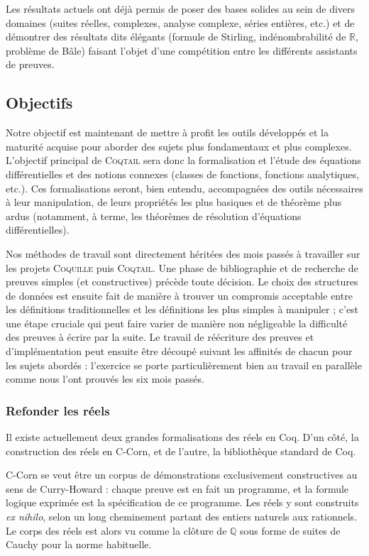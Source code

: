 \documentclass[11pt]{article}
\newcommand{\coqtail}{\textsc{Coqtail}}
\newcommand{\coquille}{\textsc{Coquille}}
\begin{document}
Les résultats actuels ont déjà permis de poser des bases solides au sein de divers domaines (suites réelles, complexes, analyse complexe, séries entières, etc.) et de démontrer des résultats dits élégants (formule de Stirling, indénombrabilité de $\mathbb{R}$, problème de Bâle) faisant l'objet d'une compétition entre les différents assistants de preuves\cite{Freek}.

\subsection{Objectifs}

Notre objectif est maintenant de mettre à profit les outils développés et la maturité acquise pour aborder des sujets plus fondamentaux et plus complexes. L'objectif principal de \coqtail{} sera donc la formalisation et l'étude des équations différentielles et des notions connexes (classes de fonctions, fonctions analytiques, etc.). Ces formalisations seront, bien entendu, accompagnées des outils nécessaires à leur manipulation, de leurs propriétés les plus basiques et de théorème plus ardus (notamment, à terme, les théorèmes de résolution d'équations différentielles).

Nos méthodes de travail sont directement héritées des mois passés à travailler sur les projets \coquille{} puis \coqtail{}. Une phase de bibliographie et de recherche de preuves simples (et constructives) précède toute décision. Le choix des structures de données est ensuite fait de manière à trouver un compromis acceptable entre les définitions traditionnelles et les définitions les plus simples à manipuler ; c'est une étape cruciale qui peut faire varier de manière non négligeable la difficulté des preuves à écrire par la suite. Le travail de réécriture des preuves et d'implémentation peut ensuite être découpé suivant les affinités de chacun pour les sujets abordés : l'exercice se porte particulièrement bien au travail en parallèle comme nous l'ont prouvés les six mois passés.

\subsubsection{Refonder les réels}

Il existe actuellement deux grandes formalisations des réels en Coq. D'un côté, la construction des réels en C-Corn, et de l'autre, la bibliothèque standard de Coq.

C-Corn se veut être un corpus de démonstrations exclusivement constructives au sens de Curry-Howard : chaque preuve est en fait un programme, et la formule logique exprimée est la spécification de ce programme. Les réels y sont construits \emph{ex nihilo}, selon un long cheminement partant des entiers naturels aux rationnels. Le corps des réels est alors vu comme la clôture de $\mathbb{Q}$ sous forme de suites de Cauchy pour la norme habituelle.
\end{document}
